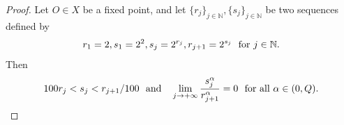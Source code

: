 \documentclass[10pt]{amsart}
\numberwithin{equation}{section}
\begin{document}
 \begin{proof}Let $O\in X$ be a fixed point, and let 
% 
% 
$\{r_j\}_{j\in\mathbb N}, \{s_j\}_{j\in\mathbb N}$ be two sequences defined by 
 \[
 	r_1=2, s_1=2^{2}, s_{j}=2^{r_{j}}, r_{j+1}=2^{s_j} \ \ \text{\rm for  $j\in\mathbb N$}.
 \]
 Then 
 \begin{equation}\label{eq6.4-0809}
 	100 r_j<s_{j}<r_{j+1}/100 \ \ \text{\rm and \ \ } \lim_{j\to+\infty} \frac{s_j^\alpha}{r_{j+1}^\alpha}=0 \text{\rm \ \ for all $\alpha\in(0,Q)$}.
 \end{equation}



\end{proof}
\end{document}
